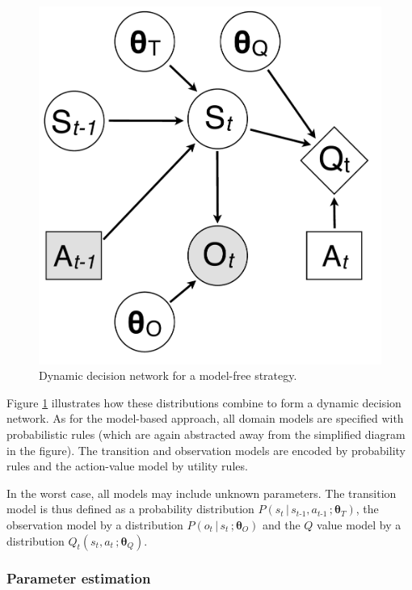 \begin{figure}
\vspace{-2mm}
\centering
\includegraphics[scale=0.25]{imgs/modelfreediagram.pdf}
\vspace{-2mm}
\caption{Dynamic decision network for a model-free strategy.}
\label{fig:modelfreediagram}
\end{figure}

Figure \ref{fig:modelfreediagram} illustrates how these distributions combine to form a dynamic decision network. As for the model-based approach, all domain models are specified with probabilistic rules (which are again abstracted away from the simplified diagram in the figure). The transition and observation models are encoded by probability rules and the action-value model by utility rules. 

In the worst case, all models may include unknown parameters.  The transition model is thus defined as a probability distribution $P(s_t \, | \, s_{t\mbox{-}1}, a_{t\mbox{-}1} \,; \boldsymbol\theta_T)$, the observation model by a distribution $P(o_t \, | \, s_t\,; \boldsymbol\theta_O)$ and the $Q$ value model by a distribution $Q_t(s_t,a_t\,; \boldsymbol\theta_Q)$.  

\subsubsection*{Parameter estimation}


